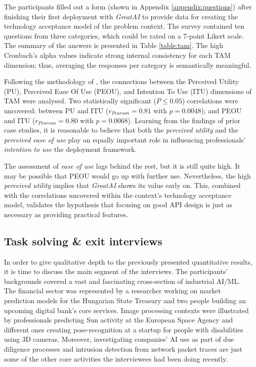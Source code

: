 The participants filled out a form (shown in Appendix \ref{appendix:questions}) after finishing their first deployment with \textit{GreatAI} to provide data for creating the technology acceptance model of the problem context. The survey contained ten questions from three categories, which could be rated on a 7-point Likert scale. The summary of the answers is presented in Table \ref{table:tam}. The high Cronbach's alpha values indicate strong internal consistency \cite{nunnally1994psychometric} for each TAM dimension; thus, averaging the responses per category is semantically meaningful.

Following the methodology of \cite{cruz2019catalog}, the connections between the Perceived Utility (PU), Perceived Ease Of Use (PEOU), and Intention To Use (ITU) dimensions of TAM were analysed. Two statistically significant ($P \leq 0.05$) correlations were uncovered: between PU and ITU ($r_{Pearson} = 0.81$ with $p = 0.0048$); and PEOU and ITU ($r_{Pearson} = 0.80$ with $p = 0.0068$). Learning from the findings of prior case studies, it is reasonable to believe that both the \textit{perceived utility} and the \textit{perceived ease of use} play an equally important role in influencing professionals' \textit{intention to use} the deployment framework.

The assessment of \textit{ease of use} lags behind the rest, but it is still quite high. It may be possible that PEOU would go up with further use. Nevertheless, the high \textit{perceived utility} implies that \textit{GreatAI} shows its value early on. This, combined with the correlations uncovered within the context's technology acceptance model, validates the hypothesis that focusing on good API design is just as necessary as providing practical features.

\subsection{Task solving \& exit interviews}

In order to give qualitative depth to the previously presented quantitative results, it is time to discuss the main segment of the interviews. The participants' backgrounds covered a vast and fascinating cross-section of industrial AI/ML. The financial sector was represented by a researcher working on market prediction models for the Hungarian State Treasury and two people building an upcoming digital bank's core services. Image processing contexts were illustrated by professionals predicting Sun activity at the European Space Agency and different ones creating pose-recognition at a startup for people with disabilities using 3D cameras. Moreover, investigating companies' AI use as part of due diligence processes and intrusion detection from network packet traces are just some of the other core activities the interviewees had been doing recently. 


